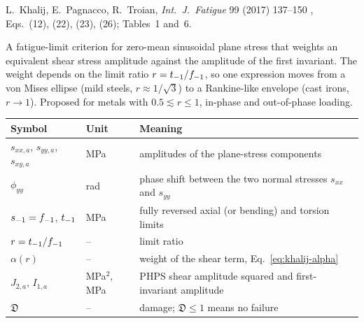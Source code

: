 \label{sheet:KHALIJ}

 L.~Khalij, E.~Pagnacco, R.~Troian, \emph{Int.\ J.\ Fatigue} 99 (2017) 137--150
\cite{khalij2017}, Eqs.~(12), (22), (23), (26); Tables~1 and~6.

 A fatigue-limit criterion for zero-mean sinusoidal plane stress that
weights an equivalent shear stress amplitude against the amplitude of the first invariant. The
weight depends on the limit ratio $r=t_{-1}/f_{-1}$, so one expression moves from a von Mises ellipse
(mild steels, $r\approx 1/\sqrt3$) to a Rankine-like envelope (cast irons, $r\to1$). Proposed for
metals with $0.5\lesssim r\le 1$, in-phase and out-of-phase loading.

\begin{center}\small
\begin{tabular}{@{}llp{100mm}@{}}
\toprule
Symbol & Unit & Meaning\\\midrule
$s_{xx,a}$, $s_{yy,a}$, $s_{xy,a}$ & MPa & amplitudes of the plane-stress components\\
$\phi_{yy}$ & rad & phase shift between the two normal stresses $s_{xx}$ and $s_{yy}$\\
$s_{-1}=f_{-1}$, $t_{-1}$ & MPa & fully reversed axial (or bending) and torsion limits\\
$r=t_{-1}/f_{-1}$ & -- & limit ratio\\
$\alpha(r)$ & -- & weight of the shear term, Eq.~\eqref{eq:khalij-alpha}\\
$J_{2,a}$, $I_{1,a}$ & MPa$^2$, MPa & PHPS shear amplitude squared and first-invariant amplitude\\
$\mathfrak D$ & -- & damage; $\mathfrak D\le1$ means no failure\\
\bottomrule
\end{tabular}
\end{center}

